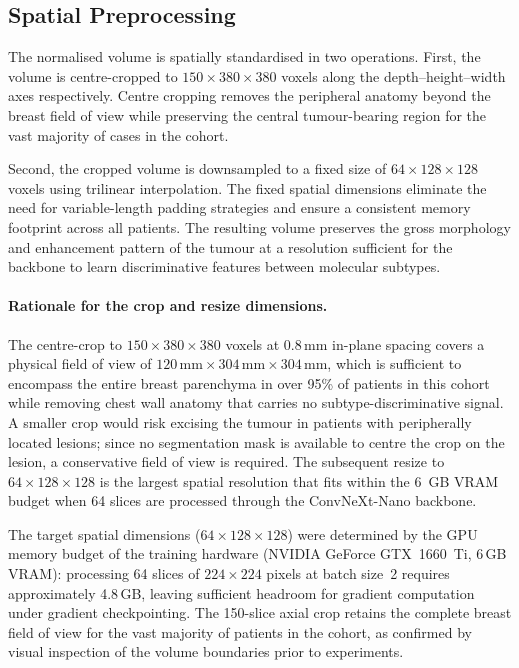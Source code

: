 \subsection{Spatial Preprocessing}
\label{sec:resampling}

The normalised volume is spatially standardised in two
operations.
First, the volume is centre-cropped to
$150 \times 380 \times 380$ voxels along the
depth--height--width axes respectively.
Centre cropping removes the peripheral anatomy beyond the
breast field of view while preserving the central tumour-bearing
region for the vast majority of cases in the cohort.

Second, the cropped volume is downsampled to a fixed size
of $64 \times 128 \times 128$ voxels using trilinear
interpolation.
The fixed spatial dimensions eliminate the need for
variable-length padding strategies and ensure a consistent
memory footprint across all patients.
The resulting volume preserves the gross morphology and
enhancement pattern of the tumour at a resolution sufficient
for the backbone to learn discriminative features between
molecular subtypes.

\paragraph{Rationale for the crop and resize dimensions.}
The centre-crop to $150 \times 380 \times 380$ voxels
at $0.8\,\text{mm}$ in-plane spacing covers a physical
field of view of $120\,\text{mm} \times 304\,\text{mm}
\times 304\,\text{mm}$, which is sufficient to
encompass the entire breast parenchyma in over 95\%
of patients in this cohort while removing chest wall
anatomy that carries no subtype-discriminative signal.
A smaller crop would risk excising the tumour in
patients with peripherally located lesions; since no
segmentation mask is available to centre the crop on
the lesion, a conservative field of view is required.
The subsequent resize to $64 \times 128 \times 128$
is the largest spatial resolution that fits within
the 6~GB VRAM budget when 64 slices are processed
through the ConvNeXt-Nano backbone.

The target spatial dimensions ($64 \times 128 \times 128$)
were determined by the GPU memory budget of the training
hardware (NVIDIA GeForce GTX~1660~Ti, 6\,GB VRAM):
processing 64 slices of $224 \times 224$ pixels at
batch size~2 requires approximately 4.8\,GB, leaving
sufficient headroom for gradient computation under
gradient checkpointing.
The 150-slice axial crop retains the complete breast
field of view for the vast majority of patients in the
cohort, as confirmed by visual inspection of the volume
boundaries prior to experiments.


